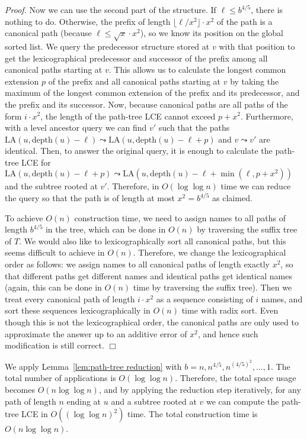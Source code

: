 \documentclass [10pt]{article}
\newcommand{\qed}{\hfill\ensuremath{\Box}\medskip\\\noindent}
\newenvironment{proof}{\noindent\emph{Proof. }}{}
\newcommand{\depth}{\ensuremath{\mathrm{depth}}}
\newcommand{\LA}{\ensuremath{\mathrm{LA}}}
\begin{document}
\begin{proof}
Now we can use the second part of the structure. If $\ell \leq b^{4/5}$, there is nothing to do. Otherwise, the prefix of
length $\lfloor \ell / x^{2}\rfloor \cdot x^{2}$ of the path is a canonical path (because $\ell \leq \sqrt{x}\cdot x^{2}$),
so we know its position on the global sorted list.
We query the predecessor structure stored at $v$ with that position to get the lexicographical predecessor and successor of the prefix
among all canonical paths starting at $v$. This allows us to calculate the longest common extension $p$ of the prefix and all canonical paths
starting at $v$ by taking the maximum of the longest common extension of the prefix and its predecessor, and the prefix and its successor.
Now, because canonical paths are all paths of the form $i \cdot x^{2}$, the length of the path-tree LCE cannot exceed $p+x^{2}$.
Furthermore, with a level ancestor query we can find $v'$ such that the paths $\LA(u,\depth(u)-\ell) \leadsto \LA(u,\depth(u)-\ell+p)$ and
$v \leadsto v'$ are identical. Then, to answer the original query, it is enough to calculate the path-tree LCE for
$\LA(u,\depth(u)-\ell+p) \leadsto \LA(u,\depth(u)-\ell+\min(\ell,p+x^{2}))$ and the subtree rooted at $v'$.
Therefore, in $O(\log\log n)$ time we can reduce the query so that the path is of length at most $x^{2}=b^{4/5}$ as claimed.

To achieve $O(n)$ construction time, we need to assign names to all paths of length $b^{4/5}$ in the tree, which can be done in
$O(n)$ by traversing the suffix tree of $T$. We would also like to lexicographically sort all canonical paths, but this seems
difficult to achieve in $O(n)$. Therefore, we change the lexicographical order as follows: we assign names to all canonical
paths of length exactly $x^{2}$, so that different paths get different names and identical paths get identical names
(again, this can be done in $O(n)$ time by traversing the suffix tree). Then we treat every canonical path of length $i\cdot x^{2}$
as a sequence consisting of $i$ names, and sort these sequences lexicographically in $O(n)$ time with radix sort.
Even though this is not the lexicographical order, the canonical paths are only used to approximate the answer up to an additive
error of $x^{2}$, and hence such modification is still correct.
\qed
\end{proof}

We apply Lemma~\ref{lem:path-tree reduction} with $b=n,n^{4/5},n^{(4/5)^{2}},\ldots,1$. The total number of applications is
$O(\log\log n)$. Therefore, the total space usage becomes $O(n\log\log n)$, and by applying the reduction step iteratively,
for any path of length $n$ ending at $u$ and a subtree rooted at $v$ we can compute the path-tree LCE in $O((\log\log n)^{2})$ time.
The total construction time is $O(n\log\log n)$.
\end{document}
